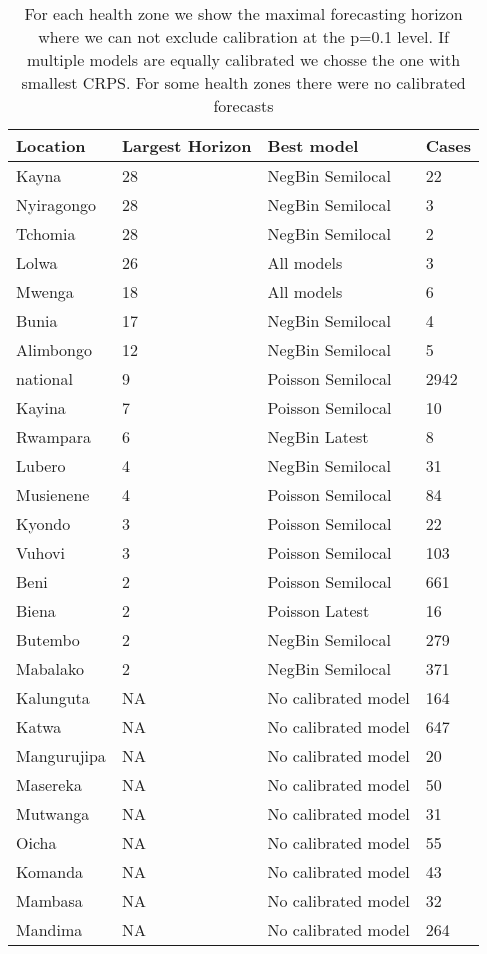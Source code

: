\begin{table}[h!]
\centering
\begin{tabular}{|l|l|l|l|}
  \hline
Location & Largest Horizon & Best model & Cases \\ 
  \hline
Kayna & 28 & NegBin Semilocal & 22 \\ 
  Nyiragongo & 28 & NegBin Semilocal & 3 \\ 
  Tchomia & 28 & NegBin Semilocal & 2 \\ 
  Lolwa & 26 & All models & 3 \\ 
  Mwenga & 18 & All models & 6 \\ 
  Bunia & 17 & NegBin Semilocal & 4 \\ 
  Alimbongo & 12 & NegBin Semilocal & 5 \\ 
  national & 9 & Poisson Semilocal & 2942 \\ 
  Kayina & 7 & Poisson Semilocal & 10 \\ 
  Rwampara & 6 & NegBin Latest & 8 \\ 
  Lubero & 4 & NegBin Semilocal & 31 \\ 
  Musienene & 4 & Poisson Semilocal & 84 \\ 
  Kyondo & 3 & Poisson Semilocal & 22 \\ 
  Vuhovi & 3 & Poisson Semilocal & 103 \\ 
  Beni & 2 & Poisson Semilocal & 661 \\ 
  Biena & 2 & Poisson Latest & 16 \\ 
  Butembo & 2 & NegBin Semilocal & 279 \\ 
  Mabalako & 2 & NegBin Semilocal & 371 \\ 
  Kalunguta & NA & No calibrated model & 164 \\ 
  Katwa & NA & No calibrated model & 647 \\ 
  Mangurujipa & NA & No calibrated model & 20 \\ 
  Masereka & NA & No calibrated model & 50 \\ 
  Mutwanga & NA & No calibrated model & 31 \\ 
  Oicha & NA & No calibrated model & 55 \\ 
  Komanda & NA & No calibrated model & 43 \\ 
  Mambasa & NA & No calibrated model & 32 \\ 
  Mandima & NA & No calibrated model & 264 \\ 
   \hline
\end{tabular}
\caption{For each health zone we show the maximal forecasting horizon where we can not exclude calibration at the p=0.1 level. If multiple models are equally calibrated we chosse the one with smallest CRPS. For some health zones there were no calibrated forecasts} 
\label{tab:best_model}
\end{table}
